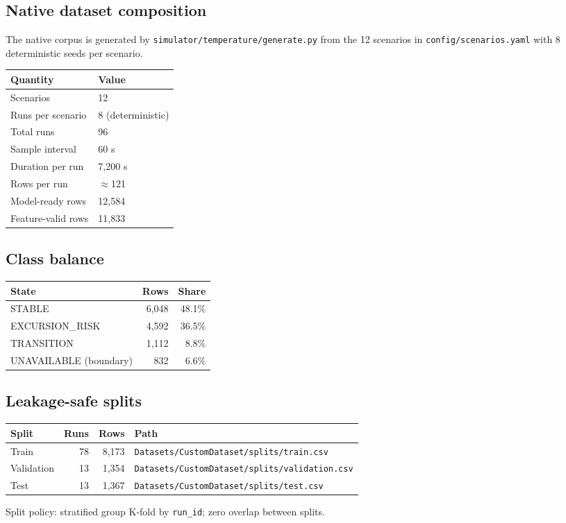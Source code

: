 \documentclass[11pt,a4paper]{article}
\begin{document}
\subsection{Native dataset composition}
The native corpus is generated by \texttt{simulator/temperature/generate.py}
from the 12 scenarios in \texttt{config/scenarios.yaml} with 8 deterministic
seeds per scenario.

\begin{center}
\begin{tabular}{ll}
\toprule
\textbf{Quantity} & \textbf{Value} \\
\midrule
Scenarios & 12 \\
Runs per scenario & 8 (deterministic) \\
Total runs & 96 \\
Sample interval & 60 s \\
Duration per run & 7{,}200 s \\
Rows per run & $\approx$121 \\
Model-ready rows & 12{,}584 \\
Feature-valid rows & 11{,}833 \\
\bottomrule
\end{tabular}
\end{center}

\subsection{Class balance}
\begin{center}
\begin{tabular}{lrr}
\toprule
\textbf{State} & \textbf{Rows} & \textbf{Share} \\
\midrule
\rowcolor{blue!8} STABLE & 6{,}048 & 48.1\% \\
\rowcolor{blue!4} EXCURSION\_RISK & 4{,}592 & 36.5\% \\
\rowcolor{blue!4} TRANSITION & 1{,}112 & 8.8\% \\
\rowcolor{gray!10} UNAVAILABLE (boundary) & 832 & 6.6\% \\
\bottomrule
\end{tabular}
\end{center}

\subsection{Leakage-safe splits}
\begin{center}
\begin{tabular}{lrrl}
\toprule
\textbf{Split} & \textbf{Runs} & \textbf{Rows} & \textbf{Path} \\
\midrule
Train & 78 & 8{,}173 & \texttt{Datasets/CustomDataset/splits/train.csv} \\
Validation & 13 & 1{,}354 & \texttt{Datasets/CustomDataset/splits/validation.csv} \\
Test & 13 & 1{,}367 & \texttt{Datasets/CustomDataset/splits/test.csv} \\
\bottomrule
\end{tabular}
\end{center}
Split policy: stratified group K-fold by \texttt{run\_id}; zero overlap
between splits.
\end{document}
